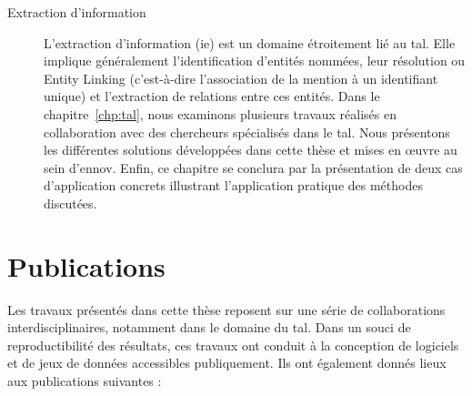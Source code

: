 \begin{description}
    \item[Extraction d'information] L'extraction d'information (\acrshort{ie}) est un domaine étroitement lié au \gls{tal}.
    Elle implique généralement l'identification d'entités nommées, leur résolution ou Entity Linking (c'est-à-dire l'association de la mention à un identifiant unique) et l'extraction de relations entre ces entités.
    Dans le chapitre~\ref{chp:tal}, nous examinons plusieurs travaux réalisés en collaboration avec des chercheurs spécialisés dans le \gls{tal}.
    Nous présentons les différentes solutions développées dans cette thèse et mises en œuvre au sein d'\gls{ennov}.
    Enfin, ce chapitre se conclura par la présentation de deux cas d'application concrets illustrant l'application pratique des méthodes discutées.
\end{description}

\section{Publications}

Les travaux présentés dans cette thèse reposent sur une série de collaborations interdisciplinaires, notamment dans le domaine du \gls{tal}.
Dans un souci de reproductibilité des résultats, ces travaux ont conduit à la conception de logiciels et de jeux de données accessibles publiquement.
Ils ont également donnés lieux aux publications suivantes :

\begin{bibunit}[alphaurl]
    \nocite{amaviNaturalLanguageQuerying2020}
    \nocite{chabinGraphRewritingRules2020}
    \nocite{minardDOINGDEFTCascade2020}
    \nocite{chabinGraphRewritingRules2021}
    \nocite{hiotDOINGDEFTUtilisation2021}
    \nocite{savaryRelationExtractionClinical2022}
    \nocite{chabinManagingLinkedNulls2023}

    \renewcommand{\bibname}{}
    \renewcommand{\section}[1]{}
\end{bibunit}
